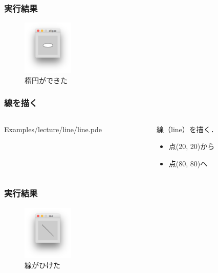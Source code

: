 \documentclass[10pt, dvipdfmx]{beamer}
\begin{document}
        \begin{frame}
            \frametitle{実行結果}
                \begin{figure}[htb]
                    \includegraphics[width=24mm]{images/03.png}
                    \caption{楕円ができた}
                    \label{fig:03}
                \end{figure}
        \end{frame}

        \begin{frame}
            \frametitle{線を描く}
            \begin{columns}[c]
                \begin{column}{0.50\textwidth}
                    \tiny
                    Examples/lecture/line/line.pde
                    \scriptsize
                \end{column}
                \begin{column}{0.50\textwidth}
                    \begin{block}{線（line）を描く．}
                        \begin{itemize}
                            \item 点(20, 20)から
                            \item 点(80, 80)へ
                        \end{itemize}
                    \end{block}
                \end{column}
            \end{columns}
        \end{frame}

        \begin{frame}
            \frametitle{実行結果}
                \begin{figure}[htb]
                    \includegraphics[width=24mm]{images/04.png}
                    \caption{線がひけた}
                    \label{fig:04}
                \end{figure}
        \end{frame}
\end{document}
